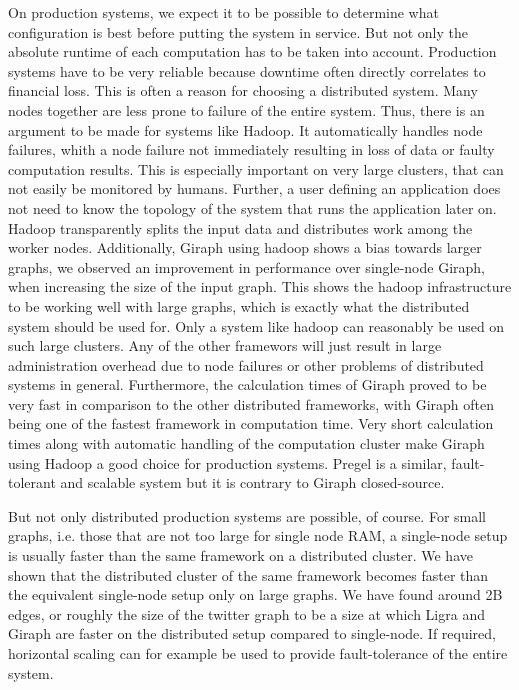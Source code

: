 On production systems, we expect it to be possible to determine what configuration is best before putting the system in service.
But not only the absolute runtime of each computation has to be taken into account. Production systems have to be very reliable because downtime often directly correlates to financial loss.
This is often a reason for choosing a distributed system. Many nodes together are less prone to failure of the entire system.
Thus, there is an argument to be made for systems like Hadoop.
It automatically handles node failures, whith a node failure not immediately resulting in loss of data or faulty computation results.
This is especially important on very large clusters, that can not easily be monitored by humans.
Further, a user defining an application does not need to know the topology of the system that runs the application later on.
Hadoop transparently splits the input data and distributes work among the worker nodes.
Additionally, Giraph using hadoop shows a bias towards larger graphs, we observed an improvement in performance over single-node Giraph, when increasing the size of the input graph.
This shows the hadoop infrastructure to be working well with large graphs, which is exactly what the distributed system should be used for. 
Only a system like hadoop can reasonably be used on such large clusters.
Any of the other framewors will just result in large administration overhead due to node failures or other problems of distributed systems in general.
Furthermore, the calculation times of Giraph proved to be very fast in comparison to the other distributed frameworks, with Giraph often being one of the fastest framework in computation time.
Very short calculation times along with automatic handling of the computation cluster make Giraph using Hadoop a good choice for production systems.
Pregel is a similar, fault-tolerant and scalable system but it is contrary to Giraph closed-source.

But not only distributed production systems are possible, of course. 
For small graphs, i.e. those that are not too large for single node RAM, a single-node setup is usually faster than the same framework on a distributed cluster. 
We have shown that the distributed cluster of the same framework becomes faster than the equivalent single-node setup only on large graphs.
We have found around 2B edges, or roughly the size of the twitter graph to be a size at which Ligra and Giraph are faster on the distributed setup compared to single-node.
If required, horizontal scaling can for example be used to provide fault-tolerance of the entire system.

